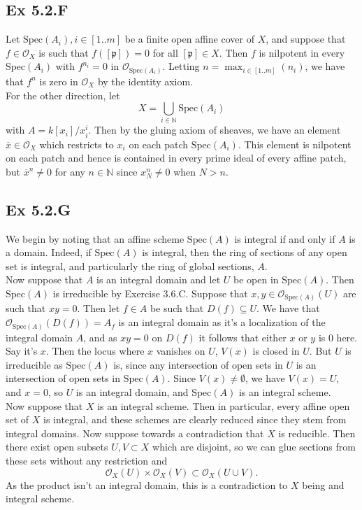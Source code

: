 \documentclass{article}
\theoremstyle{definition}
\newcommand{\N}{\mathbb{N}}
\newcommand{\oo}{\mathcal{O}}
\newcommand{\osp}[1]{\oo_{\Spec\left(#1\right)}}
\newcommand{\Spec}{\text{Spec}}
\begin{document}
\subsection*{Ex 5.2.F}

Let $\Spec(A_i), i \in [1..m]$ be a finite open affine cover of $X$, and
suppose that $f \in \oo_{X}$ is such that $f([\mathfrak{p}]) = 0$ for all
$[\mathfrak{p}] \in X$. Then $f$ is nilpotent in every $\Spec(A_i)$ with
$f^{n_i} = 0$ in $\osp{A_i}$. Letting $n = \max_{i \in [1..m]}(n_i)$, we have
that $f^n$ is zero in $\oo_{X}$ by the identity axiom. \\

For the other direction, let
\[
	X
	=
	\bigcup_{i \in \N} \Spec(A_i)
\]
with $A = k[x_i]/x_i^i$. Then by the gluing axiom of sheaves, we have an
element $\overline{x} \in \oo_{X}$ which restricts to $x_i$ on each patch
$\Spec(A_i)$. This element is nilpotent on each patch and hence is contained in
every prime ideal of every affine patch, but $\overline{x}^n \not = 0$ for any
$n \in \N$ since $x_N^{n} \not = 0$ when $N > n$.

\subsection*{Ex 5.2.G}

We begin by noting that an affine scheme $\Spec(A)$ is integral if and only	if
$A$ is a domain. Indeed, if $\Spec(A)$ is integral, then the ring of sections
of any open set is integral, and particularly the ring of global sections, $A$.
\\

Now suppose that $A$ is an integral domain and let $U$ be open in $\Spec(A)$.
Then $\Spec(A)$ is irreducible by Exercise 3.6.C. Suppose that $x, y \in
\osp{A}(U)$ are such that $xy = 0$. Then let $f \in A$ be such that $D(f)
\subseteq U$. We have that $\osp{A}(D(f)) = A_f$ is an integral domain as it's
a localization of the integral domain $A$, and as $xy = 0$ on $D(f)$ it follows
that either $x$ or $y$ is $0$ here. Say it's $x$. Then the locus where $x$
vanishes on $U$, $V(x)$ is closed in $U$. But $U$ is irreducible as $\Spec(A)$
is, since any intersection of open sets in $U$ is an intersection of open sets
in $\Spec(A)$. Since $V(x) \not = \emptyset$, we have $V(x) = U$, and $x = 0$,
so $U$ is an integral domain, and $\Spec(A)$ is an integral scheme. \\

Now suppose that $X$ is an integral scheme. Then in particular, every affine
open set of $X$ is integral, and these schemes are clearly reduced since they
stem from integral domains. Now suppose towards a contradiction that $X$ is
reducible. Then there exist open subsets $U, V \subset X$ which are disjoint,
so we can glue sections from these sets without any restriction and
\[
	\oo_{X}(U)
	\times
	\oo_{X}(V)
	\subset
	\oo_{X}(U \cup V).
\]
As the product isn't an integral domain, this is a contradiction to $X$ being
and integral scheme. \\
\end{document}
